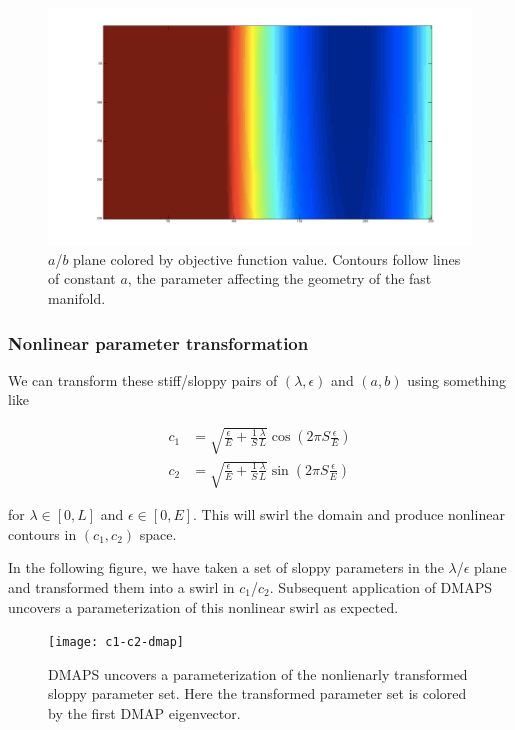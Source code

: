 \documentclass[11pt]{article}
\begin{document}
\begin{figure}[htbp]
  \centering
  \includegraphics[width=\linewidth]{zagaris-ab-contours}
  \caption{$a$/$b$ plane colored by objective function value. Contours follow lines of constant $a$, the parameter affecting the geometry of the fast manifold.}
\end{figure}

\subsubsection{Nonlinear parameter transformation}

We can transform these stiff/sloppy pairs of $(\lambda, \epsilon)$ and $(a, b)$ using something like

\begin{align*}
  c_1 &= \sqrt{\frac{\epsilon}{E} + \frac{1}{S}\frac{\lambda}{L}} \cos(2\pi S \frac{\epsilon}{E}) \\
  c_2 &= \sqrt{\frac{\epsilon}{E} + \frac{1}{S}\frac{\lambda}{L}} \sin(2\pi S \frac{\epsilon}{E})
\end{align*}

for $\lambda \in [0, L]$ and $\epsilon \in [0, E]$. This will swirl the domain and produce nonlinear contours in $(c_1, c_2)$ space.

In the following figure, we have taken a set of sloppy parameters in the $\lambda$/$\epsilon$ plane and transformed them into a swirl in $c_1$/$c_2$. Subsequent application of DMAPS uncovers a parameterization of this nonlinear swirl as expected.

\begin{figure}[htbp]
  \centering
  \texttt{[image: c1-c2-dmap]}
  \caption{DMAPS uncovers a parameterization of the nonlienarly transformed sloppy parameter set. Here the transformed parameter set is colored by the first DMAP eigenvector.}
\end{figure}

% 
% 
\end{document}
